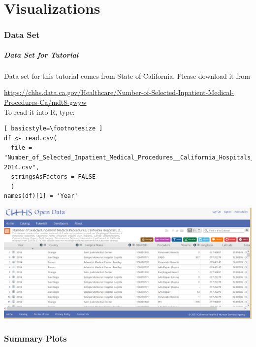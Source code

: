\part{Visualizations}

\section{Data Set}
\begin{frame}
\frametitle{Data Set for Tutorial}
	Data set for this tutorial comes from State of California.  Please download it from \\
	\vspace{5pt}

	\noindent \url{https://chhs.data.ca.gov/Healthcare/Number-of-Selected-Inpatient-Medical-Procedures-Ca/mdt8-gwyw}  \\

	\vspace{5pt}
	\noindent To read it into R, type:
  		\begin{lstlisting}[ basicstyle=\footnotesize ]
df <- read.csv(
  file = "Number_of_Selected_Inpatient_Medical_Procedures__California_Hospitals__2005-2014.csv",
  stringsAsFactors = FALSE
  )
names(df)[1] = 'Year'
		\end{lstlisting}
\newpage
    \begin{center}
     \includegraphics[width=1\textwidth]{images/data.png}
    \end{center}	
\end{frame}


\section[Summary Plots]{Summary Plots}

